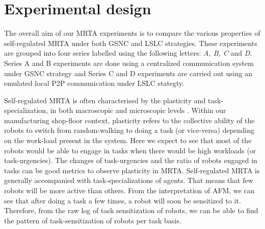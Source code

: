 \documentclass[journal]{IEEEtran}
\begin{document}
\section{Experimental design}
\label{sec:expt-design}
The overall aim of our MRTA experiments is to compare the various properties of self-regulated MRTA under both GSNC and LSLC strategies. These experiments are grouped into four series labelled using the following letters: \textit{A, B, C} and \textit{D}. Series A and B experiments are done using a centralized communication system under GSNC strategy and Series C and D experiments are carried out using an emulated local P2P communication under LSLC stategty. %
%

Self-regulated MRTA is often characterised by the plasticity and task-specialization, in both macroscopic and microscopic levels \cite{Garnier+2007}. Within our manufacturing shop-floor context, plasticity refers to the collective ability of the robots to switch from  random-walking to doing a task (or vice-versa) depending on the work-load present in the system. Here we expect to see that most of the robots would be able to engage in tasks when there would be high workloads (or task-urgencies). The changes of task-urgencies and the ratio of robots engaged in tasks can be good metrics to observe plasticity in MRTA.
%
Self-regulated MRTA is generally accompanied with task-specializations of agents. That means that few robots will be more active than others. From the interpretation of AFM, we can see that after doing a task a few times, a robot will soon be sensitized to it. Therefore, from the raw log of task sensitization of robots, we can be able to find the pattern of task-sensitization of robots per task basis.
%
\end{document}
